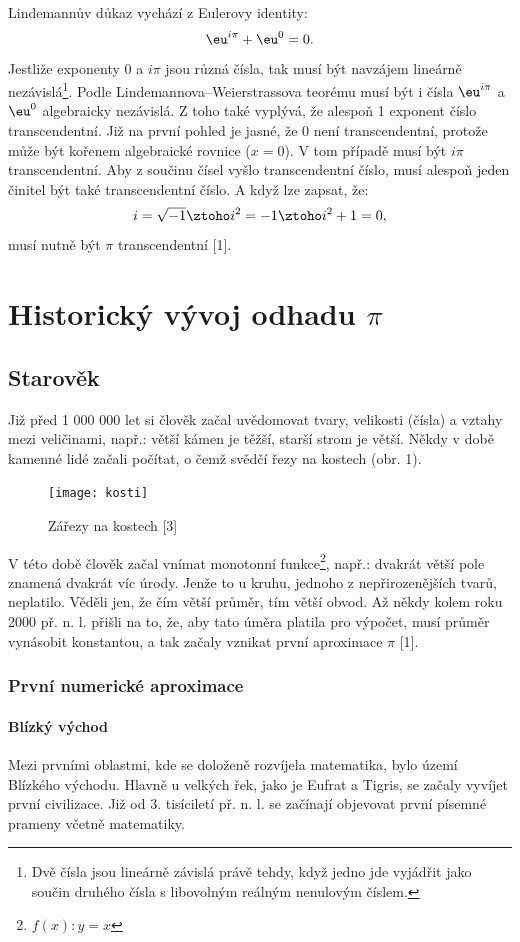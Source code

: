 \documentclass[rocnikovka]{gzwroc} %
\begin{document}
Lindemannův důkaz vychází z Eulerovy identity:
$$
\eu^{i\pi}+\eu^{0}=0.
$$
Jestliže exponenty 0 a $i\pi$ jsou různá čísla, tak musí být navzájem lineárně nezávislá\footnote[3]{Dvě čísla jsou lineárně závislá právě tehdy, když jedno jde vyjádřit jako součin druhého čísla s libovolným reálným nenulovým číslem.}. Podle Lindemannova–Weierstrassova teorému musí být i čísla $\eu^{i\pi}$ a $\eu^{0}$ algebraicky nezávislá. Z toho také vyplývá, že alespoň 1 exponent číslo transcendentní. Již na první pohled je jasné, že 0 není transcendentní, protože může být kořenem algebraické rovnice ($x=0$). V tom případě musí být $i\pi$ transcendentní. Aby z součinu čísel vyšlo transcendentní číslo, musí alespoň jeden činitel být také transcendentní číslo. A když lze zapsat, že:
$$
i=\sqrt{-1} \ztoho i^2=-1 \ztoho i^2+1=0,
$$
musí nutně být $\pi$ transcendentní [1].
\section{Historický vývoj odhadu $\pi$}
\subsection{Starověk}
Již před 1 000 000 let si člověk začal uvědomovat tvary, velikosti (čísla) a vztahy mezi veličinami, např.: větší kámen je těžší, starší strom je větší. Někdy v době kamenné lidé začali počítat, o čemž svědčí řezy na kostech (obr. 1).
\begin{figure}[!ht]
\texttt{[image: kosti]}
\caption{Zářezy na kostech [3]}
\label{fig:kruh}
\end{figure}
V této době člověk začal vnímat monotonní funkce\footnote[4]{$f(x): y=x$}, např.: dvakrát větší pole znamená dvakrát víc úrody. Jenže to u kruhu, jednoho z nepřirozenějších tvarů, neplatilo. Věděli jen, že čím větší průměr, tím větší obvod. Až někdy kolem roku 2000 př. n. l. přišli na to, že, aby tato úměra platila pro výpočet, musí  průměr vynásobit konstantou, a tak začaly vznikat první aproximace $\pi$ [1].
\subsubsection{První numerické aproximace}
\paragraph{Blízký východ}
Mezi prvními oblastmi, kde se doloženě rozvíjela matematika, bylo území Blízkého východu. Hlavně u velkých řek, jako je Eufrat a Tigris, se začaly vyvíjet první civilizace. Již od 3. tisíciletí př. n. l. se začínají objevovat první písemné prameny včetně matematiky.
\end{document}
